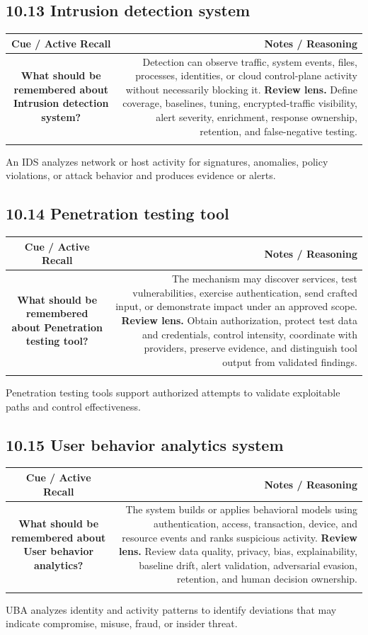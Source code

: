 \documentclass[11pt]{article}
\newcommand{\CornellHeader}{\rowcolor{Navy}\color{white}\bfseries Cue / Active Recall & \color{white}\bfseries Notes / Reasoning \\\endhead}
\newcommand{\CornellRow}[2]{\cellcolor{CueGray}\textbf{#1} & #2 \\\addlinespace[3pt]}
\begin{document}
\subsection{10.13 Intrusion detection system}
\begin{longtable}{@{}C N@{}}
\CornellHeader
\CornellRow{What should be remembered about Intrusion detection system?}{Detection can observe traffic, system events, files, processes, identities, or cloud control-plane activity without necessarily blocking it. \textbf{Review lens.} Define coverage, baselines, tuning, encrypted-traffic visibility, alert severity, enrichment, response ownership, retention, and false-negative testing.}
\end{longtable}
\begin{sectionsummarybox}
An IDS analyzes network or host activity for signatures, anomalies, policy violations, or attack behavior and produces evidence or alerts.
\end{sectionsummarybox}
\subsection{10.14 Penetration testing tool}
\begin{longtable}{@{}C N@{}}
\CornellHeader
\CornellRow{What should be remembered about Penetration testing tool?}{The mechanism may discover services, test vulnerabilities, exercise authentication, send crafted input, or demonstrate impact under an approved scope. \textbf{Review lens.} Obtain authorization, protect test data and credentials, control intensity, coordinate with providers, preserve evidence, and distinguish tool output from validated findings.}
\end{longtable}
\begin{sectionsummarybox}
Penetration testing tools support authorized attempts to validate exploitable paths and control effectiveness.
\end{sectionsummarybox}
\subsection{10.15 User behavior analytics system}
\begin{longtable}{@{}C N@{}}
\CornellHeader
\CornellRow{What should be remembered about User behavior analytics?}{The system builds or applies behavioral models using authentication, access, transaction, device, and resource events and ranks suspicious activity. \textbf{Review lens.} Review data quality, privacy, bias, explainability, baseline drift, alert validation, adversarial evasion, retention, and human decision ownership.}
\end{longtable}
\begin{sectionsummarybox}
UBA analyzes identity and activity patterns to identify deviations that may indicate compromise, misuse, fraud, or insider threat.
\end{sectionsummarybox}
\end{document}
